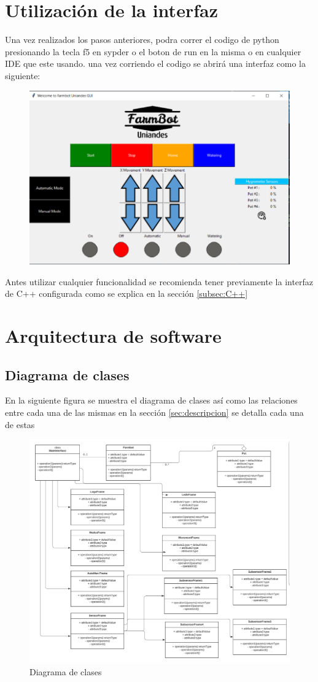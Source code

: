 \documentclass[letterpaper,12pt]{article}
\begin{document}
	\section{Utilización de la interfaz}
	Una vez realizados los pasos anteriores, podra correr el codigo de python presionando la tecla f5 en sypder o el boton de run en la misma o en cualquier IDE que este usando. una vez corriendo el codigo se abrirá una interfaz como la siguiente:
	\begin{figure}[H]
		\centering
		\includegraphics[width=0.7\linewidth]{images/python1}
		\label{fig:python1}
	\end{figure}
	Antes utilizar cualquier funcionalidad se recomienda tener previamente la interfaz de C++ configurada como se explica en la sección \ref{subsec:C++}
	
	\section{Arquitectura de software}
	\subsection{Diagrama de clases}
	En la siguiente figura se muestra el diagrama de clases así como las relaciones entre cada una de las mismas en la sección \ref{sec:descripcion} se detalla cada una de estas
	\begin{figure}[H]
		\centering
		\includegraphics[width=1\linewidth]{images/ClaseUML}
		\caption{Diagrama de clases}
		\label{fig:claseuml}
	\end{figure}
\end{document}
